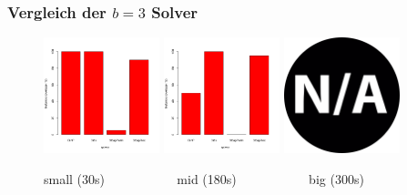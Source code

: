 \documentclass{beamer}
\begin{document}
\begin{frame}
\frametitle{Vergleich der $b = 3$ Solver}

\begin{figure}
\centering
\includegraphics[width=0.3\textwidth]{images/solver_instance_coverage_small_b=3.png}
\includegraphics[width=0.3\textwidth]{images/solver_instance_coverage_mid_b=3.png}
\includegraphics[width=0.3\textwidth]{images/na.png}
\caption*{small (30s) $\quad\quad\quad\quad\quad$ mid (180s) $\quad\quad\quad\quad\quad$ big (300s)}
\end{figure}
\begin{figure}[H]
\begin{subfigure}[b]{0.4\textwidth}
\centering
{}

\end{subfigure}
\end{figure}
\end{frame}
\end{document}
